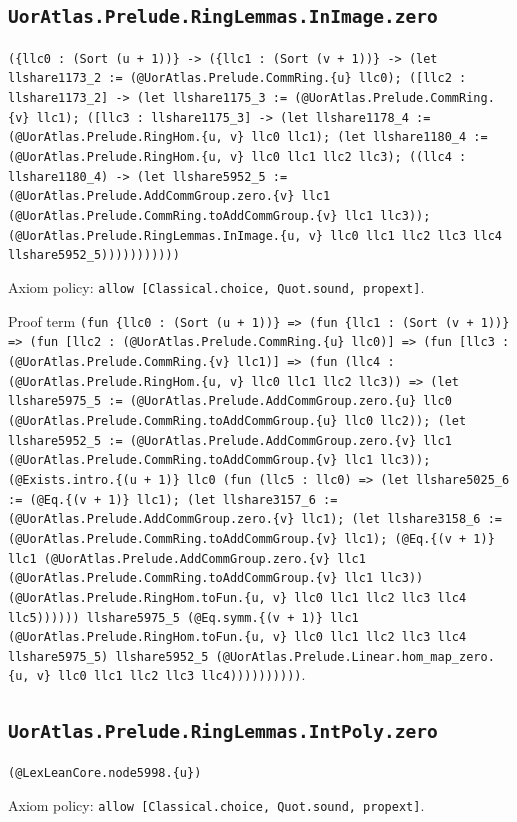 \documentclass[11pt]{article}
\begin{document}
\subsection*{\texttt{UorAtlas.Prelude.RingLemmas.InImage.zero}}
\noindent\texttt{(\{llc0 : (Sort (u + 1))\} -> (\{llc1 : (Sort (v + 1))\} -> (let llshare1173\_2 := (@UorAtlas.Prelude.CommRing.\{u\} llc0); ([llc2 : llshare1173\_2] -> (let llshare1175\_3 := (@UorAtlas.Prelude.CommRing.\{v\} llc1); ([llc3 : llshare1175\_3] -> (let llshare1178\_4 := (@UorAtlas.Prelude.RingHom.\{u, v\} llc0 llc1); (let llshare1180\_4 := (@UorAtlas.Prelude.RingHom.\{u, v\} llc0 llc1 llc2 llc3); ((llc4 : llshare1180\_4) -> (let llshare5952\_5 := (@UorAtlas.Prelude.AddCommGroup.zero.\{v\} llc1 (@UorAtlas.Prelude.CommRing.toAddCommGroup.\{v\} llc1 llc3)); (@UorAtlas.Prelude.RingLemmas.InImage.\{u, v\} llc0 llc1 llc2 llc3 llc4 llshare5952\_5)))))))))))}\par
\noindent Axiom policy: \texttt{allow [Classical.choice, Quot.sound, propext]}.\par
\noindent Proof term \texttt{(fun \{llc0 : (Sort (u + 1))\} => (fun \{llc1 : (Sort (v + 1))\} => (fun [llc2 : (@UorAtlas.Prelude.CommRing.\{u\} llc0)] => (fun [llc3 : (@UorAtlas.Prelude.CommRing.\{v\} llc1)] => (fun (llc4 : (@UorAtlas.Prelude.RingHom.\{u, v\} llc0 llc1 llc2 llc3)) => (let llshare5975\_5 := (@UorAtlas.Prelude.AddCommGroup.zero.\{u\} llc0 (@UorAtlas.Prelude.CommRing.toAddCommGroup.\{u\} llc0 llc2)); (let llshare5952\_5 := (@UorAtlas.Prelude.AddCommGroup.zero.\{v\} llc1 (@UorAtlas.Prelude.CommRing.toAddCommGroup.\{v\} llc1 llc3)); (@Exists.intro.\{(u + 1)\} llc0 (fun (llc5 : llc0) => (let llshare5025\_6 := (@Eq.\{(v + 1)\} llc1); (let llshare3157\_6 := (@UorAtlas.Prelude.AddCommGroup.zero.\{v\} llc1); (let llshare3158\_6 := (@UorAtlas.Prelude.CommRing.toAddCommGroup.\{v\} llc1); (@Eq.\{(v + 1)\} llc1 (@UorAtlas.Prelude.AddCommGroup.zero.\{v\} llc1 (@UorAtlas.Prelude.CommRing.toAddCommGroup.\{v\} llc1 llc3)) (@UorAtlas.Prelude.RingHom.toFun.\{u, v\} llc0 llc1 llc2 llc3 llc4 llc5)))))) llshare5975\_5 (@Eq.symm.\{(v + 1)\} llc1 (@UorAtlas.Prelude.RingHom.toFun.\{u, v\} llc0 llc1 llc2 llc3 llc4 llshare5975\_5) llshare5952\_5 (@UorAtlas.Prelude.Linear.hom\_map\_zero.\{u, v\} llc0 llc1 llc2 llc3 llc4))))))))))}.\par
\subsection*{\texttt{UorAtlas.Prelude.RingLemmas.IntPoly.zero}}
\noindent\texttt{(@LexLeanCore.node5998.\{u\})}\par
\noindent Axiom policy: \texttt{allow [Classical.choice, Quot.sound, propext]}.\par
\end{document}
